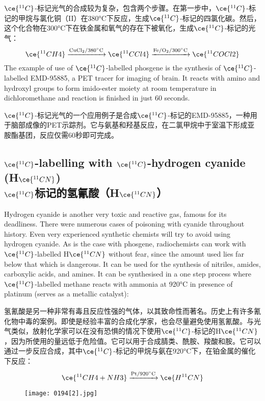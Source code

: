 \documentclass[dvipsnames, svgnames,a4paper,11pt]{article}
\begin{document}
\(\ce{^{11}C}\)-标记光气的合成较为复杂，包含两个步骤。在第一步中，\(\ce{^{11}C}\)-标记的甲烷与氯化铜（II）在380°C下反应，生成\(\ce{^{11}C}\)-标记的四氯化碳。然后，这个化合物在300°C下在铁金属和氧气的存在下被氧化，生成\(\ce{^{11}C}\)-标记的光气：  
\[
\ce{^{11}CH4} \xrightarrow{\mathrm{CuCl_2/380^\circ C}} \ce{^{11}CCl4}   \xrightarrow{\mathrm{Fe/O_2/300^\circ C}} \ce{^{11}COCl2}
\]
The example of use of \(\ce{^{11}C}\)-labelled phosgene is the synthesis of \(\ce{^{11}C}\)-labelled EMD-95885, a PET tracer for imaging of brain. It reacts with amino and hydroxyl groups to form imido-ester moiety at room temperature in dichloromethane and reaction is finished in just 60 seconds.

\(\ce{^{11}C}\)-标记光气的一个应用例子是合成\(\ce{^{11}C}\)-标记的EMD-95885，一种用于脑部成像的PET示踪剂。它与氨基和羟基反应，在二氯甲烷中于室温下形成亚胺酯基团，反应仅需60秒即可完成。




\subsection{\(\ce{^{11}C}\)-labelling with \(\ce{^{11}C}\)-hydrogen cyanide (H\(\ce{^{11}CN}\)) \\ \(\ce{^{11}C}\)标记的氢氰酸（H\(\ce{^{11}CN}\)）}  
Hydrogen cyanide is another very toxic and reactive gas, famous for its deadliness. There were numerous cases of poisoning with cyanide throughout history. Even very experienced synthetic chemists will try to avoid using hydrogen cyanide. As is the case with phosgene, radiochemists can work with \(\ce{^{11}C}\)-labelled H\(\ce{^{11}CN}\) without fear, since the amount used lies far below that which is dangerous. It can be used for the synthesis of nitriles, amides, carboxylic acids, and amines. It can be synthesised in a one step process where \(\ce{^{11}C}\)-labelled methane reacts with ammonia at 920°C in presence of platinum (serves as a metallic catalyst): 

氢氰酸是另一种非常有毒且反应性强的气体，以其致命性而著名。历史上有许多氰化物中毒的案例。即使是经验丰富的合成化学家，也会尽量避免使用氢氰酸。与光气类似，放射化学家可以在没有恐惧的情况下使用\(\ce{^{11}C}\)-标记的H\(\ce{^{11}CN}\)，因为所使用的量远低于危险值。它可以用于合成腈类、酰胺、羧酸和胺。它可以通过一步反应合成，其中\(\ce{^{11}C}\)-标记的甲烷与氨在920°C下，在铂金属的催化下反应：  
\[
\ce{^{11}CH4 + NH3} \xrightarrow{\mathrm{Pt/920^\circ C}} \ce{H^{11}CN}
\]

\begin{figure}[h]
	\centering
    \texttt{[image: 0194[2].jpg]}  
     \label{fig230}
\end{figure}
\end{document}
